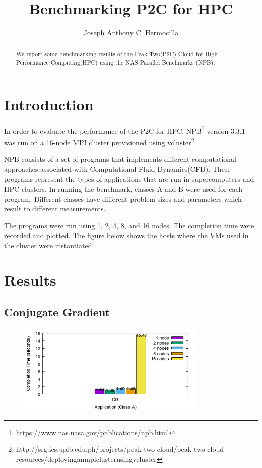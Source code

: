 \documentclass[a4paper]{article}
\title{Benchmarking P2C for HPC}
\author{Joseph Anthony C. Hermocilla}
\begin{document}
\maketitle

\begin{abstract}
We report some benchmarking results of the Peak-Two(P2C) Cloud for High-Performance Computing(HPC) using the NAS Parallel Benchmarks (NPB).
\end{abstract}

\section{Introduction}

In order to evaluate the performance of the P2C\cite{hermocilla-p2c-ncite2014} for HPC, NPB\footnote{https://www.nas.nasa.gov/publications/npb.html} version 3.3.1 was run on a 16-node MPI cluster provisioned using vcluster\footnote{http://srg.ics.uplb.edu.ph/projects/peak-two-cloud/peak-two-cloud-resources/deployinganmpiclusterusingvcluster}.

NPB consists of a set of programs that implements different computational approaches associated with Computational Fluid Dynamics(CFD). These programs represent the types of applications that are run in supercomputers and HPC clusters. In running the benchmark, classes A and B were used for each program. Different classes have different problem sizes and parameters which result to different measurements.

The programs were run using 1, 2, 4, 8, and 16 nodes. The completion time were recorded and plotted. 
The figure below shows the hosts where the VMs used in the cluster were instantiated. 


\section{Results}

\subsection{Conjugate Gradient}

\begin{figure}[H]
\centering
\includegraphics[width=0.8\textwidth]{figures/CGvA.png}
\caption{\label{fig:CGvA}}
\end{figure}
\end{document}
